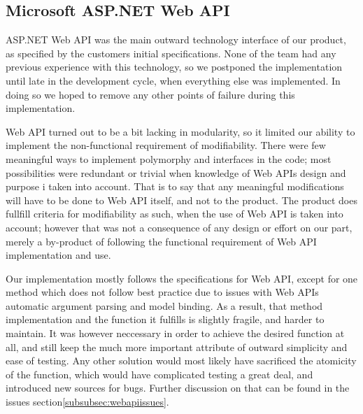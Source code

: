 \subsection{Microsoft ASP.NET Web API}
\label{subsec:webapiimpl}

ASP.NET Web API was the main outward technology interface of our product, as specified by the customers initial specifications. None of the team had any previous experience
with this technology, so we postponed the implementation until late in the development cycle, when everything else was implemented. In doing so we hoped to remove any other points
of failure during this implementation.

Web API turned out to be a bit lacking in modularity, so it limited our ability to implement the non-functional requirement of modifiability. There were few meaningful ways to implement
polymorphy and interfaces in the code; most possibilities were redundant or trivial when knowledge of Web APIs design and purpose i taken into account. That is to say that any meaningful
modifications will have to be done to Web API itself, and not to the product. The product does fullfill criteria for modifiability as such, when the use of Web API is taken into account;
however that was not a consequence of any design or effort on our part, merely a by-product of following the functional requirement of Web API implementation and use.

Our implementation mostly follows the specifications for Web API, except for one method which does not follow best practice due to issues with Web APIs automatic argument parsing and model binding.
As a result, that method implementation and the function it fulfills is slightly fragile, and harder to maintain. It was however neccessary in order to achieve the desired function at all, and still
keep the much more important attribute of outward simplicity and ease of testing. Any other solution would most likely have sacrificed the atomicity of the function, which would have complicated testing a great deal, and introduced new sources for bugs. Further discussion on that can be found in the issues section\ref{subsubsec:webapiissues}.
